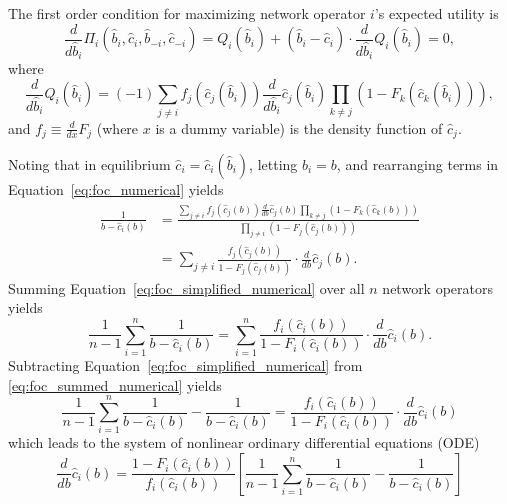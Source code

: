 The first order condition for maximizing network operator $i$'s expected utility is
\begin{equation}
  \label{eq:foc_numerical}
  \frac{d}{d\hat{b}_i}\Pi_i(\hat{b}_i,\hat{c}_i,\hat{b}_{-i},\hat{c}_{-i}) = Q_i(\hat{b}_i) + (\hat{b}_i - \hat{c}_i)\cdot\frac{d}{d\hat{b}_i}Q_i(\hat{b}_i) = 0,
\end{equation}
where
\begin{equation*}
  \frac{d}{d\hat{b}_i}Q_i(\hat{b}_i) = (-1)\sum_{j\neq i} f_j(\hat{c}_j(\hat{b}_i))\frac{d}{d\hat{b}_i}\hat{c}_j(\hat{b}_i)\prod_{k\neq j} \left( 1 - F_k(\hat{c}_k(\hat{b}_i)) \right),
\end{equation*}
and $f_j\equiv\frac{d}{dx}F_j$ (where $x$ is a dummy variable) is the density function of $\hat{c}_j$.

Noting that in equilibrium $\hat{c}_i = \hat{c}_i(\hat{b}_i)$, letting $\hat{b}_i = b$, and rearranging terms in Equation~\eqref{eq:foc_numerical} yields
\begin{align}
  \label{eq:foc_simplified_numerical}
  \frac{1}{b - \hat{c}_i(b)} 
  &= \frac{\sum_{j\neq i} f_j(\hat{c}_j(b))\frac{d}{db}\hat{c}_j(b)\prod_{k\neq j} \left( 1 - F_k(\hat{c}_k(b)) \right)}{\prod_{j\neq i} \left( 1 - F_j(\hat{c}_j(b)) \right)}\nonumber \\[2ex]
  &= \sum_{j\neq i}\frac{f_j(\hat{c}_j(b))}{1 - F_j(\hat{c}_j(b))}\cdot\frac{d}{db}\hat{c}_j(b).
\end{align}
Summing Equation~\eqref{eq:foc_simplified_numerical} over all $n$ network operators yields
\begin{equation}
  \label{eq:foc_summed_numerical}
  \frac{1}{n-1}\sum_{i=1}^n \frac{1}{b - \hat{c}_i(b)} = \sum_{i=1}^n \frac{f_i(\hat{c}_i(b))}{1 - F_i(\hat{c}_i(b))}\cdot\frac{d}{db}\hat{c}_i(b).
\end{equation}
Subtracting Equation~\eqref{eq:foc_simplified_numerical} from \eqref{eq:foc_summed_numerical} yields 
\begin{equation*}
  \frac{1}{n-1}\sum_{i=1}^n \frac{1}{b - \hat{c}_i(b)} - \frac{1}{b - \hat{c}_i(b)} = \frac{f_i(\hat{c}_i(b))}{1 - F_i(\hat{c}_i(b))}\cdot\frac{d}{db}\hat{c}_i(b)
\end{equation*}
which leads to the system of nonlinear ordinary differential equations (ODE)
\begin{equation}
  \label{eq:foc_ode_numerical}
  \frac{d}{db}\hat{c}_i(b) = \frac{1 - F_i(\hat{c}_i(b))}{f_i(\hat{c}_i(b))}\left[ \frac{1}{n-1}\sum_{i=1}^n \frac{1}{b-\hat{c}_i(b)} - \frac{1}{b-\hat{c}_i(b)} \right]
\end{equation}
